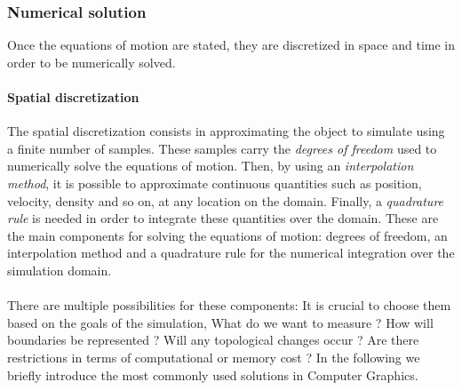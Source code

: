 \subsubsection{Numerical solution}

Once the equations of motion are stated, they are discretized in space and time in order to be numerically solved.

\paragraph{Spatial discretization}
The spatial discretization consists in approximating the object to simulate using a finite number of samples. 
These samples carry the \emph{degrees of freedom} used to numerically solve the equations of motion.
Then, by using an \emph{interpolation method}, it is possible to approximate continuous quantities such as position, velocity, density and so on, at any location on the domain. 
Finally, a \emph{quadrature rule} is needed in order to integrate these quantities over the domain. 
These are the main components for solving the equations of motion:
degrees of freedom, an interpolation method and a quadrature rule for the numerical integration over the simulation domain.
\\ \\
There are multiple possibilities for these components: It is crucial to choose them based on the goals of the simulation, What do we want to measure ? How will boundaries be represented ? Will any topological changes occur ? Are there restrictions in terms of computational or memory cost ? In the following we briefly introduce the most commonly used solutions in Computer Graphics.

